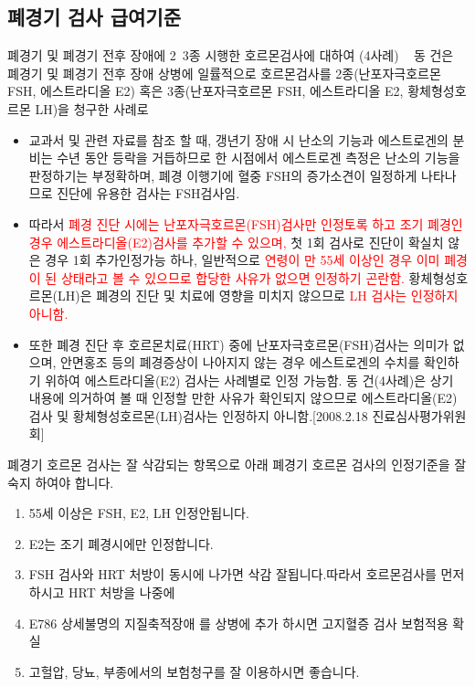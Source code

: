 \subsection{폐경기 검사 급여기준}
폐경기 및 폐경기 전후 장애에 2~3종 시행한 호르몬검사에 대하여 (4사례)
  
동 건은 폐경기 및 폐경기 전후 장애 상병에 일률적으로 호르몬검사를 2종(난포자극호르몬 FSH, 에스트라디올 E2) 혹은 3종(난포자극호르몬 FSH, 에스트라디올 E2, 황체형성호르몬 LH)을 청구한 사례로
\begin{itemize}\tightlist
\item 교과서 및 관련 자료를 참조 할 때, 갱년기 장애 시 난소의 기능과 에스트로겐의 분비는 수년 동안 등락을 거듭하므로 한 시점에서 에스트로겐 측정은 난소의 기능을 판정하기는 부정확하며, 폐경 이행기에 혈중 FSH의 증가소견이 일정하게 나타나므로 진단에 유용한 검사는 FSH검사임.
\item 따라서 \textcolor{red}{폐경 진단 시에는 난포자극호르몬(FSH)검사만 인정토록 하고 조기 폐경인 경우 에스트라디올(E2)검사를 추가할 수 있으며,} 첫 1회 검사로 진단이 확실치 않은 경우 1회 추가인정가능 하나, 일반적으로 \textcolor{red}{연령이 만 55세 이상인 경우 이미 폐경이 된 상태라고 볼 수 있으므로 합당한 사유가 없으면 인정하기 곤란함.} 황체형성호르몬(LH)은 폐경의 진단 및 치료에 영향을 미치지 않으므로  \textcolor{red}{LH 검사는 인정하지 아니함.}
\item 또한 폐경 진단 후 호르몬치료(HRT) 중에 난포자극호르몬(FSH)검사는 의미가 없으며, 안면홍조 등의 폐경증상이 나아지지 않는 경우 에스트로겐의 수치를 확인하기 위하여 에스트라디올(E2) 검사는 사례별로 인정 가능함. 동 건(4사례)은 상기 내용에 의거하여 볼 때 인정할 만한 사유가 확인되지 않으므로 에스트라디올(E2)검사 및 황체형성호르몬(LH)검사는 인정하지 아니함.[2008.2.18 진료심사평가위원회]
\end{itemize}

\par
\medskip
폐경기 호르몬 검사는 잘 삭감되는 항목으로 아래 폐경기 호르몬 검사의 인정기준을 잘 숙지 하여야 합니다.
\begin{enumerate}\tightlist 
\item 55세 이상은 FSH, E2, LH 인정안됩니다.
\item E2는 조기 폐경시에만 인정합니다.
\item FSH 검사와 HRT 처방이 동시에 나가면 삭감 잘됩니다.따라서 호르몬검사를 먼저하시고 HRT 처방을 나중에
\item E786 상세불명의 지질축적장애 를 상병에 추가 하시면 고지혈증 검사 보험적용 확실
\item 고헐압, 당뇨, 부종에서의 보험청구를 잘 이용하시면 좋습니다.
\end{enumerate}
\medskip

